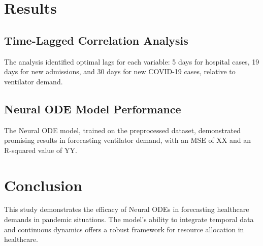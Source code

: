 \documentclass[lettersize, journal]{IEEEtran}
\begin{document}


\section{Results}
\subsection{Time-Lagged Correlation Analysis}
The analysis identified optimal lags for each variable: 5 days for hospital cases, 19 days for new admissions, and 30 days for new COVID-19 cases, relative to ventilator demand.

\subsection{Neural ODE Model Performance}
The Neural ODE model, trained on the preprocessed dataset, demonstrated promising results in forecasting ventilator demand, with an MSE of XX and an R-squared value of YY.

\section{Conclusion}
This study demonstrates the efficacy of Neural ODEs in forecasting healthcare demands in pandemic situations. The model's ability to integrate temporal data and continuous dynamics offers a robust framework for resource allocation in healthcare.


\end{document}
